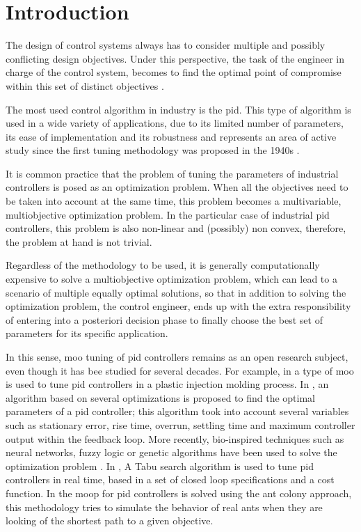 \chapter{Introduction}
\label{sec:Antecedentes}
The design of control systems always has to consider multiple and possibly conflicting design objectives. Under this perspective, the task of the engineer in charge of the control system, becomes to find the optimal point of compromise within this set of distinct objectives \citep{Garpinger2012}.

The most used control algorithm in industry is the \gls{pid}. This type of algorithm is used in a wide variety of applications, due to its limited number of parameters, its ease of implementation and its robustness \citep{astromhagglund2006} and represents an area of active study since the first tuning methodology was proposed in the 1940s \citep{Ziegler1942}.

It is common practice that the problem of tuning the parameters of industrial controllers is posed as an optimization problem. When all the objectives need to be taken into account at the same time, this problem becomes a multivariable, multiobjective optimization problem. In the particular case of industrial \gls{pid} controllers, this problem is also non-linear and (possibly) non convex, therefore, the problem at hand is not trivial.

Regardless of the methodology to be used, it is generally computationally expensive to solve a multiobjective optimization problem, which can lead to a scenario of multiple equally optimal solutions, so that in addition to solving the optimization problem, the control engineer, ends up with the extra responsibility of entering into a posteriori decision phase  to finally choose the best set of parameters for its specific application.

In this sense, \gls{moo} tuning of \gls{pid} controllers remains as an open research subject, even though it has bee studied for several decades. For example, in \citet{Seaman1994} a type of \gls{moo} is used to tune \gls{pid} controllers in a plastic injection molding process. In \citet{Abbas1995}, an algorithm based on several optimizations is proposed to find the optimal parameters of a \gls{pid} controller; this algorithm took into account several variables such as stationary error, rise time, overrun, settling time and maximum controller output within the feedback loop. More recently, bio-inspired techniques such as neural networks, fuzzy logic or genetic algorithms have been used to solve the optimization problem \citet{Reynoso-Meza2012b}. In \citet{Bagis2011}, A Tabu search algorithm is used to tune \gls{pid} controllers in real time, based in a set of closed loop specifications and a cost function. In \citet{Chiha2012} the \gls{moop} for \gls{pid} controllers is solved using the ant colony approach, this methodology tries to simulate the behavior of real ants when they are looking of the shortest path to a given objective.

